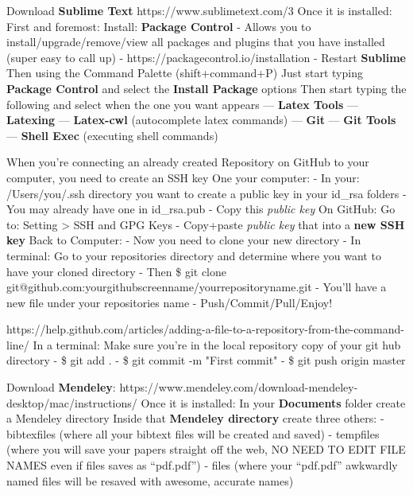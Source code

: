 Download \textbf{Sublime Text} 
https://www.sublimetext.com/3
Once it is installed:
First and foremost: Install: \textbf{Package Control}
- Allows you to install/upgrade/remove/view all packages and plugins that you have installed (super easy to call up)
- https://packagecontrol.io/installation
- Restart \textbf{Sublime}
Then using the Command Palette (shift+command+P)
Just start typing \textbf{Package Control} and select the \textbf{Install Package} options
Then start typing the following and select when the one you want appears
— \textbf{Latex Tools}
— \textbf{Latexing}
— \textbf{Latex-cwl} (autocomplete latex commands)
— \textbf{Git}
— \textbf{Git Tools}
— \textbf{Shell Exec} (executing shell commands)


When you're connecting an already created Repository on GitHub to your computer, you need to create an SSH key
One your computer:
- In your: /Users/you/.ssh directory you want to create a public key in your id_rsa folders
- You may already have one in id_rsa.pub
- Copy this \textit{public key}
On GitHub:
Go to: Setting > SSH and GPG Keys
- Copy+paste \textit{public key} that into a \textbf{new SSH key}
Back to Computer:
- Now you need to clone your new directory
- In terminal: Go to your repositories directory and determine where you want to have your cloned directory
- Then \$ git clone git@github.com:yourgithubscreenname/yourrepositoryname.git
- You'll have a new file under your repositories name
- Push/Commit/Pull/Enjoy!

https://help.github.com/articles/adding-a-file-to-a-repository-from-the-command-line/
In a terminal:
Make sure you're in the local repository copy of your git hub directory
- \$ git add .
- \$ git commit -m "First commit"
- \$ git push origin master

Download \textbf{Mendeley}:
https://www.mendeley.com/download-mendeley-desktop/mac/instructions/
Once it is installed: 
In your \textbf{Documents} folder create a Mendeley directory
Inside that \textbf{Mendeley directory} create three others:
- bibtexfiles (where all your bibtext files will be created and saved)
- tempfiles   (where you will save your papers straight off the web, NO NEED TO EDIT FILE NAMES even if files saves as ``pdf.pdf'')
- files       (where your ``pdf.pdf'' awkwardly named files will be resaved with awesome, accurate names)

